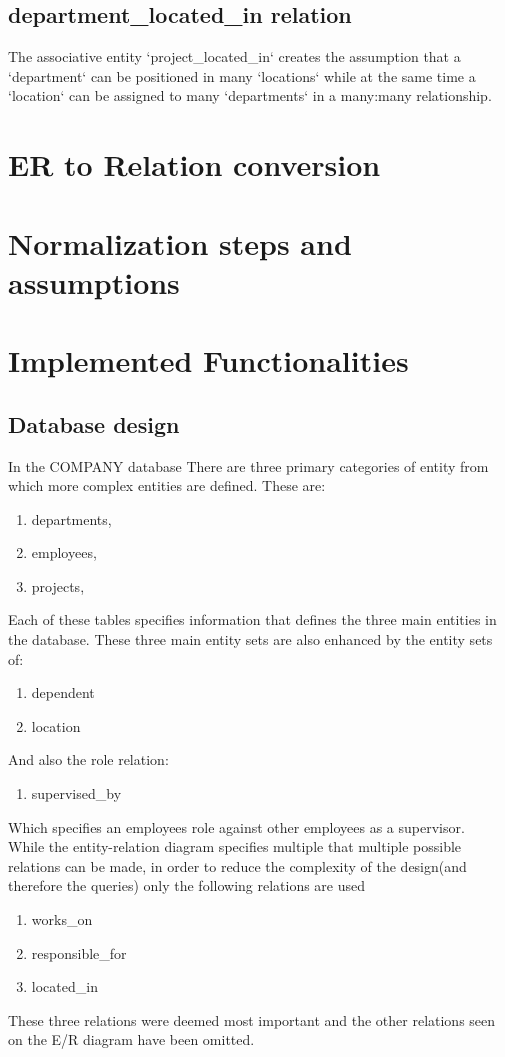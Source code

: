 \documentclass[11pt,letterpaper]{article}
\begin{document}
\subsection{department\_located\_in relation}
The associative entity `project\_located\_in` creates the assumption that a `department` can be positioned in many `locations` while at the same time a `location` can be assigned to many `departments` in a many:many relationship.

	\section{ER to Relation conversion }

\section {Normalization steps and assumptions}

\section{Implemented Functionalities}
\subsection{Database design}
In the COMPANY database There are three primary categories of entity from which more complex entities are defined. These are:
\begin{enumerate}[]
	\item departments, 
	\item employees,
	\item projects,
\end{enumerate}
Each of these tables specifies information that defines the three main entities in the database. These three main entity sets are also enhanced by the entity sets of:
\begin{enumerate}[]
	\item dependent 
	\item location	
\end{enumerate}	
And also the role relation:
\begin{enumerate}[]	
	\item supervised\_by 	
\end{enumerate}
Which specifies an employees role against other employees as a supervisor.\\
While the entity-relation diagram specifies multiple that multiple possible relations can be made, in order to reduce the complexity of the design(and therefore the queries) only the following relations are used
\begin{enumerate}[]
	\item works\_on
	\item responsible\_for
	\item located\_in
\end{enumerate}
These three relations were deemed most important and the other relations seen on the E/R diagram have been omitted.
\end{document}
